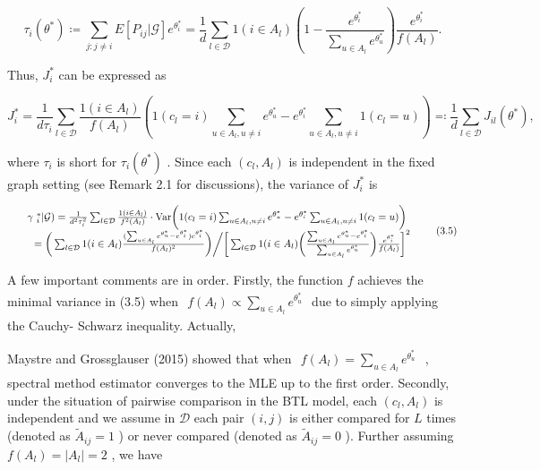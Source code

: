 \[
\tau_{i}(\theta^{*})\coloneqq \sum_{j:j\neq i}E[P_{ij}|\mathcal{G}]e^{\theta_{i}^{*}} = \frac{1}{d}\sum_{l\in \mathcal{D}}1(i\in A_{l})\left(1 - \frac{e^{\theta_{i}^{*}}}{\sum_{u\in A_{l}}e^{\theta_{u}^{*}}}\right)\frac{e^{\theta_{i}^{*}}}{f(A_{l})}. \tag{3.3}
\]

Thus, \(J_{i}^{*}\) can be expressed as

\[
J_{i}^{*} = \frac{1}{d\tau_{i}}\sum_{l\in \mathcal{D}}\frac{1(i\in A_{l})}{f(A_{l})}\left(1(c_{l} = i)\sum_{u\in A_{l},u\neq i}e^{\theta_{u}^{*}} - e^{\theta_{i}^{*}}\sum_{u\in A_{l},u\neq i}1(c_{l} = u)\right)\eqqcolon \frac{1}{d}\sum_{l\in \mathcal{D}}J_{i l}(\theta^{*}), \tag{3.4}
\]

where \(\tau_{i}\) is short for \(\tau_{i}(\theta^{*})\) . Since each
\((c_{l},A_{l})\) is independent in the fixed graph setting (see Remark
2.1 for discussions), the variance of \(J_{i}^{*}\) is

\[
\begin{array}{r l} & {\mathrm{~\gamma~}_{i}^{*}|\mathcal{G}) = \frac{1}{d^{2}\tau_{i}^{2}}\sum_{l\in \mathcal{D}}\frac{1(i\in A_{l})}{f^{2}(A_{l})}\cdot \mathrm{Var}\bigg(1(c_{l} = i)\sum_{u\in A_{l},u\neq i}e^{\theta_{u}^{*}} - e^{\theta_{i}^{*}}\sum_{u\in A_{l},u\neq i}1(c_{l} = u)\bigg)}\\ & {\quad = \bigg(\sum_{l\in \mathcal{D}}1(i\in A_{l})\frac{(\sum_{u\in A_{l}}e^{\theta_{u}^{*}} - e^{\theta_{i}^{*}})e^{\theta_{i}^{*}}}{f(A_{l})^{2}}\bigg)\bigg / \bigg[\sum_{l\in \mathcal{D}}1(i\in A_{l})\bigg(\frac{\sum_{u\in A_{l}}e^{\theta_{u}^{*}} - e^{\theta_{i}^{*}}}{\sum_{u\in A_{l}}e^{\theta_{u}^{*}}}\bigg)\frac{e^{\theta_{i}^{*}}}{f(A_{l})}\bigg]^{2}} \end{array} \tag{3.5}
\]

A few important comments are in order. Firstly, the function \(f\)
achieves the minimal variance in (3.5) when
\(\begin{array}{r}{f(A_{l})\propto \sum_{u\in A_{l}}e^{\theta_{u}^{*}}} \end{array}\)
due to simply applying the Cauchy- Schwarz inequality. Actually,

Maystre and Grossglauser (2015) showed that when
\(\begin{array}{r}f(A_l) = \sum_{u\in A_l}e^{\theta_u^*} \end{array}\) ,
spectral method estimator converges to the MLE up to the first order.
Secondly, under the situation of pairwise comparison in the BTL model,
each \((c_l,A_l)\) is independent and we assume in \(\mathcal{D}\) each
pair \((i,j)\) is either compared for \(L\) times (denoted as
\(\widetilde{A}_{ij} = 1\) ) or never compared (denoted as
\(\widetilde{A}_{ij} = 0\) ). Further assuming
\(f(A_{l}) = |A_{l}| = 2\) , we have

